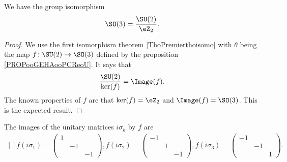 \begin{proposition}     \label{PROPooDKPTooBnLflt}
	We have the group isomorphism
	\begin{equation}
		\SO(3)=\frac{ \SU(2) }{ \eZ_2 }.
	\end{equation}
\end{proposition}

\begin{proof}
	We use the first isomorphism theorem \ref{ThoPremierthoisomo} with \( \theta\) being the map \( f\colon \SU(2)\to \SO(3)\) defined by the proposition \ref{PROPooGEHAooPCReoU}. It says that
	\begin{equation}
		\frac{ \SU(2) }{ \ker(f) }=\Image(f).
	\end{equation}
	The known properties of \( f\) are that \( \ker(f)=\eZ_2\) and \( \Image(f)=\SO(3)\). This is the expected result.
\end{proof}

\begin{lemma}       \label{LEMooSYGUooVWxGYX}
	The images of the unitary matrices \( i\sigma_k\) by \( f\) are
	\begin{equation}
		\begin{aligned}[]
			f(i\sigma_1)=\begin{pmatrix}
				             1 &    &    \\
				               & -1 &    \\
				               &    & -1
			             \end{pmatrix},
			f(i\sigma_2)=\begin{pmatrix}
				             -1 &   &    \\
				                & 1 &    \\
				                &   & -1
			             \end{pmatrix},
			f(i\sigma_3)=\begin{pmatrix}
				             -1 &    &   \\
				                & -1 &   \\
				                &    & 1
			             \end{pmatrix}.
		\end{aligned}
	\end{equation}
\end{lemma}

